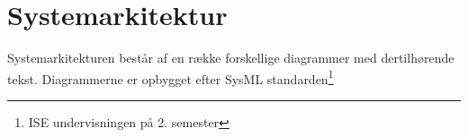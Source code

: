 \chapter{Systemarkitektur}

Systemarkitekturen består af en række forskellige diagrammer med dertilhørende tekst.
Diagrammerne er opbygget efter SysML standarden\footnote{ISE undervisningen på 2. semester}


\clearpage


\clearpage


\clearpage


\clearpage